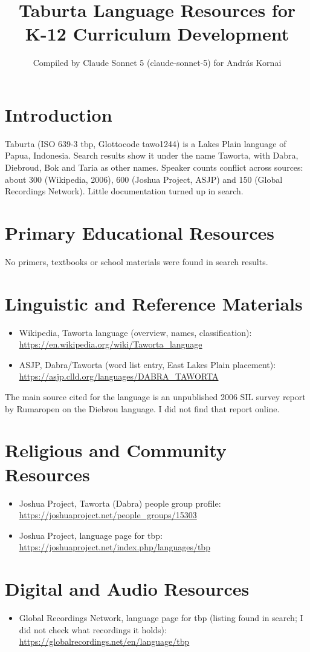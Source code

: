 \documentclass[12pt]{article}
\title{Taburta Language Resources for K-12 Curriculum Development}
\author{Compiled by Claude Sonnet 5 (claude-sonnet-5) for Andr\'as Kornai}
\date{}
\begin{document}
\maketitle

\section{Introduction}
Taburta (ISO 639-3 tbp, Glottocode tawo1244) is a Lakes Plain language of Papua, Indonesia. Search results show it under the name Taworta, with Dabra, Diebroud, Bok and Taria as other names. Speaker counts conflict across sources: about 300 (Wikipedia, 2006), 600 (Joshua Project, ASJP) and 150 (Global Recordings Network). Little documentation turned up in search.

\section{Primary Educational Resources}
No primers, textbooks or school materials were found in search results.

\section{Linguistic and Reference Materials}
\begin{itemize}
\item Wikipedia, Taworta language (overview, names, classification): \url{https://en.wikipedia.org/wiki/Taworta_language}
\item ASJP, Dabra/Taworta (word list entry, East Lakes Plain placement): \url{https://asjp.clld.org/languages/DABRA_TAWORTA}
\end{itemize}
The main source cited for the language is an unpublished 2006 SIL survey report by Rumaropen on the Diebrou language. I did not find that report online.

\section{Religious and Community Resources}
\begin{itemize}
\item Joshua Project, Taworta (Dabra) people group profile: \url{https://joshuaproject.net/people_groups/15303}
\item Joshua Project, language page for tbp: \url{https://joshuaproject.net/index.php/languages/tbp}
\end{itemize}

\section{Digital and Audio Resources}
\begin{itemize}
\item Global Recordings Network, language page for tbp (listing found in search; I did not check what recordings it holds): \url{https://globalrecordings.net/en/language/tbp}
\end{itemize}
\end{document}
